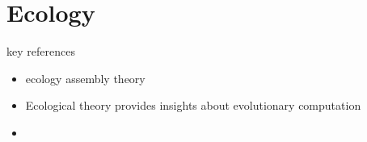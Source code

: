 \section{Ecology}

key references
\begin{itemize}
  \item ecology assembly theory \citep{dolson2024reachability}
  \item Ecological theory provides insights about evolutionary computation  \citep{dolson2018applying}
  \item
\end{itemize}
